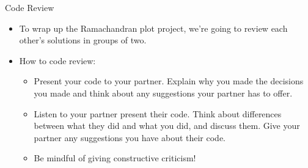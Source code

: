 \begin{frame}{Code Review}

 \begin{itemize}

  \item To wrap up the Ramachandran plot project, we're going to review each 
   other's solutions in groups of two.

  \item How to code review:

   \begin{itemize}

    \item Present your code to your partner.  Explain why you made the 
     decisions you made and think about any suggestions your partner has to 
     offer.

    \item Listen to your partner present their code.  Think about differences 
     between what they did and what you did, and discuss them.  Give your 
     partner any suggestions you have about their code.

    \item Be mindful of giving constructive criticism!

   \end{itemize}

 \end{itemize}

\end{frame}

